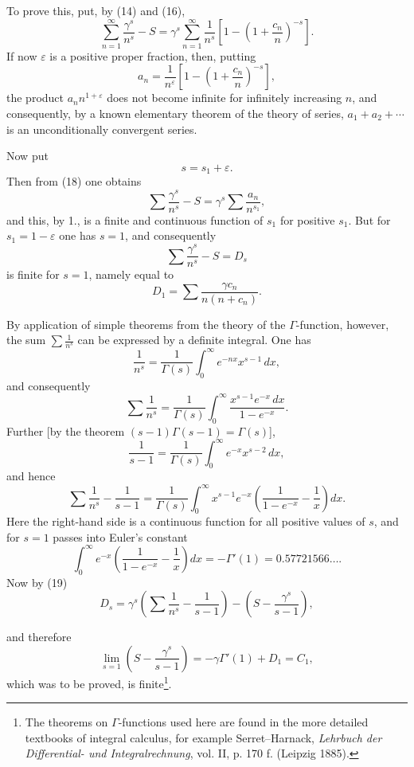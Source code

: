 \documentclass[11pt]{article}
\begin{document}
To prove this, put, by (14) and (16),
\begin{equation}
\sum_{n=1}^{\infty}\frac{\gamma^s}{n^s}-S
=\gamma^s\sum_{n=1}^{\infty}\frac1{n^s}
\left[1-\left(1+\frac{c_n}{n}\right)^{-s}\right].
\tag{18}
\end{equation}
If now $\varepsilon$ is a positive proper fraction, then, putting
\[
a_n=\frac1{n^\varepsilon}\left[1-\left(1+\frac{c_n}{n}\right)^{-s}\right],
\]
the product $a_n n^{1+\varepsilon}$ does not become infinite for infinitely increasing $n$, and consequently, by a known elementary theorem of the theory of series, $a_1+a_2+\cdots$ is an unconditionally convergent series.

Now put
\[
s=s_1+\varepsilon.
\]
Then from (18) one obtains
\[
\sum\frac{\gamma^s}{n^s}-S=\gamma^s\sum\frac{a_n}{n^{s_1}},
\]
and this, by 1., is a finite and continuous function of $s_1$ for positive $s_1$. But for $s_1=1-\varepsilon$ one has $s=1$, and consequently
\begin{equation}
\sum\frac{\gamma^s}{n^s}-S=D_s
\tag{19}
\end{equation}
is finite for $s=1$, namely equal to
\[
D_1=\sum\frac{\gamma c_n}{n(n+c_n)}.
\]

By application of simple theorems from the theory of the $\Gamma$-function, however, the sum $\sum\frac1{n^s}$ can be expressed by a definite integral. One has
\[
\frac1{n^s}=\frac1{\Gamma(s)}\int_0^\infty e^{-nx}x^{s-1}\,dx,
\]
and consequently
\[
\sum\frac1{n^s}=\frac1{\Gamma(s)}\int_0^\infty \frac{x^{s-1}e^{-x}\,dx}{1-e^{-x}}.
\]
Further [by the theorem $(s-1)\Gamma(s-1)=\Gamma(s)$],
\[
\frac1{s-1}=\frac1{\Gamma(s)}\int_0^\infty e^{-x}x^{s-2}\,dx,
\]
and hence
\[
\sum\frac1{n^s}-\frac1{s-1}
=\frac1{\Gamma(s)}\int_0^\infty x^{s-1}e^{-x}
\left(\frac1{1-e^{-x}}-\frac1x\right)dx.
\]
Here the right-hand side is a continuous function for all positive values of $s$, and for $s=1$ passes into Euler's constant
\[
\int_0^\infty e^{-x}\left(\frac1{1-e^{-x}}-\frac1x\right)dx
=-\Gamma'(1)=0.57721566\ldots .
\]
Now by (19)
\[
D_s=\gamma^s\left(\sum\frac1{n^s}-\frac1{s-1}\right)
-\left(S-\frac{\gamma^s}{s-1}\right),
\]

and therefore
\begin{equation}
\lim_{s=1}\left(S-\frac{\gamma^s}{s-1}\right)
=-\gamma\Gamma'(1)+D_1=C_1,
\tag{20}
\end{equation}
which was to be proved, is finite\footnote{The theorems on $\Gamma$-functions used here are found in the more detailed textbooks of integral calculus, for example Serret--Harnack, \emph{Lehrbuch der Differential- und Integralrechnung}, vol. II, p. 170 f. (Leipzig 1885).}.
\end{document}
